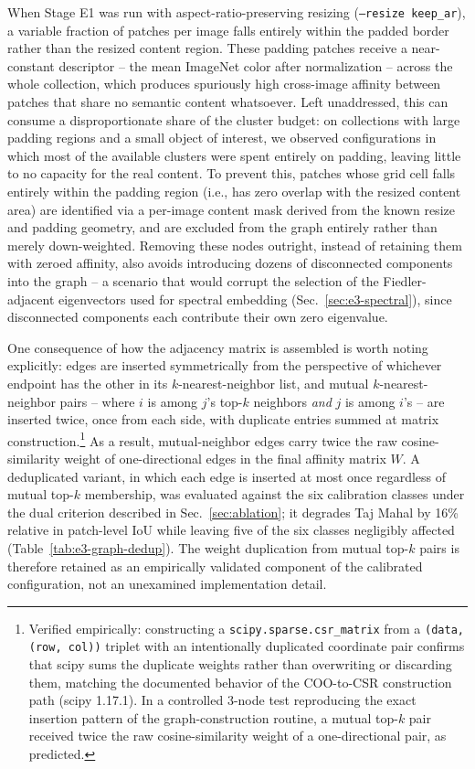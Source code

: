 When Stage E1 was run with aspect-ratio-preserving resizing (\texttt{--resize keep\_ar}), a variable fraction of patches per image falls entirely within the padded border rather than the resized content region. These padding patches receive a near-constant descriptor -- the mean ImageNet color after normalization -- across the whole collection, which produces spuriously high cross-image affinity between patches that share no semantic content whatsoever. Left unaddressed, this can consume a disproportionate share of the cluster budget: on collections with large padding regions and a small object of interest, we observed configurations in which most of the available clusters were spent entirely on padding, leaving little to no capacity for the real content. To prevent this, patches whose grid cell falls entirely within the padding region (i.e., has zero overlap with the resized content area) are identified via a per-image content mask derived from the known resize and padding geometry, and are excluded from the graph entirely rather than merely down-weighted. Removing these nodes outright, instead of retaining them with zeroed affinity, also avoids introducing dozens of disconnected components into the graph -- a scenario that would corrupt the selection of the Fiedler-adjacent eigenvectors used for spectral embedding (Sec.~\ref{sec:e3-spectral}), since disconnected components each contribute their own zero eigenvalue.

One consequence of how the adjacency matrix is assembled is worth noting explicitly: edges are inserted symmetrically from the perspective of whichever endpoint has the other in its $k$-nearest-neighbor list, and mutual $k$-nearest-neighbor pairs -- where $i$ is among $j$'s top-$k$ neighbors \emph{and} $j$ is among $i$'s -- are inserted twice, once from each side, with duplicate entries summed at matrix construction.\footnote{Verified empirically: constructing a \texttt{scipy.sparse.csr\_matrix} from a \texttt{(data, (row, col))} triplet with an intentionally duplicated coordinate pair confirms that scipy sums the duplicate weights rather than overwriting or discarding them, matching the documented behavior of the COO-to-CSR construction path (scipy 1.17.1). In a controlled 3-node test reproducing the exact insertion pattern of the graph-construction routine, a mutual top-$k$ pair received twice the raw cosine-similarity weight of a one-directional pair, as predicted.} As a result, mutual-neighbor edges carry twice the raw cosine-similarity weight of one-directional edges in the final affinity matrix $W$. A deduplicated variant, in which each edge is inserted at most once regardless of mutual top-$k$ membership, was evaluated against the six calibration classes under the dual criterion described in Sec.~\ref{sec:ablation}; it degrades Taj Mahal by 16\% relative in patch-level IoU while leaving five of the six classes negligibly affected (Table~\ref{tab:e3-graph-dedup}). The weight duplication from mutual top-$k$ pairs is therefore retained as an empirically validated component of the calibrated configuration, not an unexamined implementation detail.

